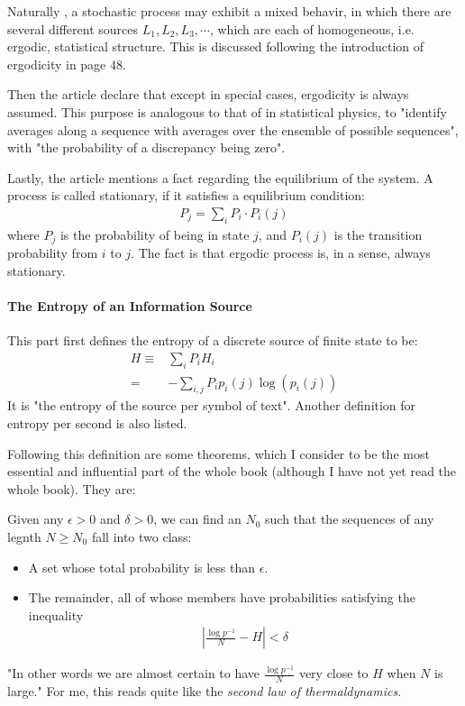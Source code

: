 Naturally , a stochastic process may exhibit a mixed behavir, in which
there are several different sources $L_1,L_2,L_3,\cdots$, which are
each of homogeneous, i.e. ergodic, statistical structure. This is
discussed following the introduction of ergodicity in page 48.

Then the article declare that except in special cases, ergodicity is
always assumed. This purpose is analogous to that of in statistical
physics, to "identify averages along a sequence with averages over 
the ensemble of possible sequences", with "the probability of a
discrepancy being zero".

Lastly, the article mentions a fact regarding the equilibrium of
the system. A process is called stationary, if it satisfies a
equilibrium condition:
\begin{align}
\label{eq:Ergodic_and_Mixed_States:equil_condition}
P_j = \sum_i P_i \cdot P_i(j)
\end{align}
where $P_j$ is the probability of being in state $j$, and $P_i(j)$ is
the transition probability from $i$ to $j$.
The fact is that ergodic process is, in a sense, always stationary.

\paragraph{The Entropy of an Information Source}
This part first defines the entropy of a discrete source of finite state
to be:
\begin{align}
\label{eq:entropy_of_discrete_infor_source}
H \equiv& \sum_i P_i H_i\\
=& -\sum_{i,j} P_i p_i(j) \log(p_i(j)) \nonumber
\end{align}
It is "the entropy of the source per symbol of text". Another
definition for entropy per second is also listed.

Following this definition are some theorems, which I consider to be
the most essential and influential part of the whole book (although
I have not yet read the whole book). They are:

\begin{thm}
   	Given any $\epsilon >0$ and $\delta >0$, we can find an $N_0$
   	such that the sequences of any legnth $N\geq N_0$ fall into
   	two class:
   	\begin{itemize}
   		\item A set whose total probability is less than $\epsilon$.
   		\item The remainder, all of whose members have probabilities
   		satisfying the inequality
   		\begin{align}
   		\label{eq:Entropy_of_info_source:thm3}
   		\left| \frac{\log p^{-1}}{N}-H\right| < \delta
   		\end{align}
   	\end{itemize}
\end{thm}
"In other words we are almost certain to have 
$\frac{\log p^{-1}}{N}$ very close to $H$ when $N$ is large."
For me, this reads quite like the \textit{second law of
   	thermaldynamics}.

